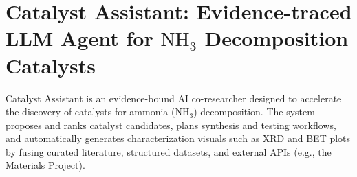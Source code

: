 




\section{Catalyst Assistant: Evidence-traced LLM Agent for $\mathrm{NH_3}$ Decomposition Catalysts}




Catalyst Assistant is an evidence-bound AI co-researcher designed to accelerate the discovery of catalysts for ammonia ($\mathrm{NH_3}$) decomposition. The system proposes and ranks catalyst candidates, plans synthesis and testing workflows, and automatically generates characterization visuals such as XRD and BET plots by fusing curated literature, structured datasets, and external APIs (e.g., the Materials Project).  

